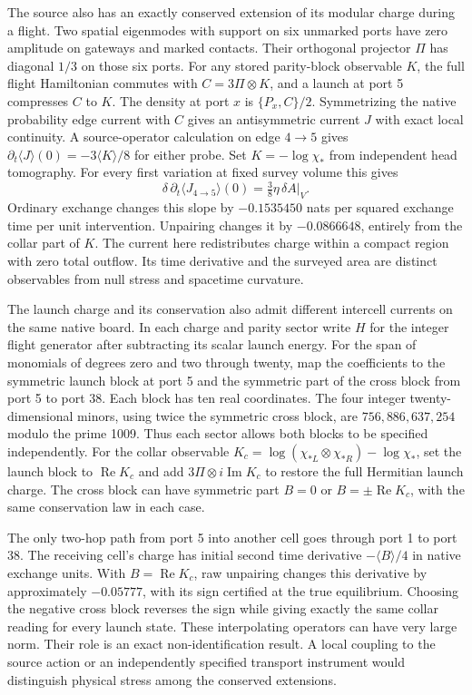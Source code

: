 \documentclass[11pt]{article}
\begin{document}
The source also has an exactly conserved extension of its modular
charge during a flight. Two spatial eigenmodes with support on six
unmarked ports have zero amplitude on gateways and marked contacts.
Their orthogonal projector \(\Pi\) has diagonal \(1/3\) on those six
ports. For any stored parity-block observable \(K\), the full flight
Hamiltonian commutes with \(C=3\Pi\otimes K\), and a launch at port
5 compresses \(C\) to \(K\). The density at port \(x\) is
\(\{P_x,C\}/2\). Symmetrizing the native probability edge current
with \(C\) gives an antisymmetric current \(J\) with exact local
continuity. A source-operator calculation on edge \(4\to5\) gives
\(\partial_t\langle J\rangle(0)=-3\langle K\rangle/8\) for either
probe. Set \(K=-\log\chi_*\) from independent head tomography.
For every first variation at fixed survey volume this gives
\[
 \delta\,\partial_t\langle J_{4\to5}\rangle(0)
     =\tfrac38\eta\,\delta A|_V .
\]
Ordinary exchange changes this slope by \(-0.1535450\) nats per
squared exchange time per unit intervention. Unpairing changes it by
\(-0.0866648\), entirely from the collar part of \(K\).
The current here redistributes charge within a compact region with
zero total outflow. Its time derivative and the surveyed area are
distinct observables from null stress and spacetime curvature.

The launch charge and its conservation also admit different
intercell currents on the same native board. In each charge and
parity sector write \(H\) for the integer flight generator after
subtracting its scalar launch energy. For the span of monomials of degrees
zero and two through twenty, map the coefficients to the symmetric
launch block at port 5 and the symmetric part of the cross block
from port 5 to port 38. Each block has ten real coordinates.
The four integer twenty-dimensional minors, using twice the symmetric
cross block, are \(756,886,637,254\) modulo the prime 1009.
Thus each sector allows both blocks to be specified independently.
For the collar observable
\(K_c=\log(\chi_{*L}\otimes\chi_{*R})-\log\chi_*\),
set the launch block to \(\operatorname{Re}K_c\) and add
\(3\Pi\otimes i\operatorname{Im}K_c\) to restore the full Hermitian
launch charge. The cross block can have symmetric part
\(B=0\) or \(B=\pm\operatorname{Re}K_c\), with the same conservation
law in each case.

The only two-hop path from port 5 into another cell goes through
port 1 to port 38. The receiving cell's charge has initial second
time derivative \(-\langle B\rangle/4\) in native exchange units.
With \(B=\operatorname{Re}K_c\), raw unpairing changes this derivative
by approximately \(-0.05777\), with its sign certified at the true
equilibrium. Choosing the negative cross block reverses the sign
while giving exactly the same collar reading for every launch state. These interpolating operators
can have very large norm. Their role is an exact non-identification
result. A local coupling to the source action or an independently
specified transport instrument would distinguish physical stress
among the conserved extensions.
\end{document}
